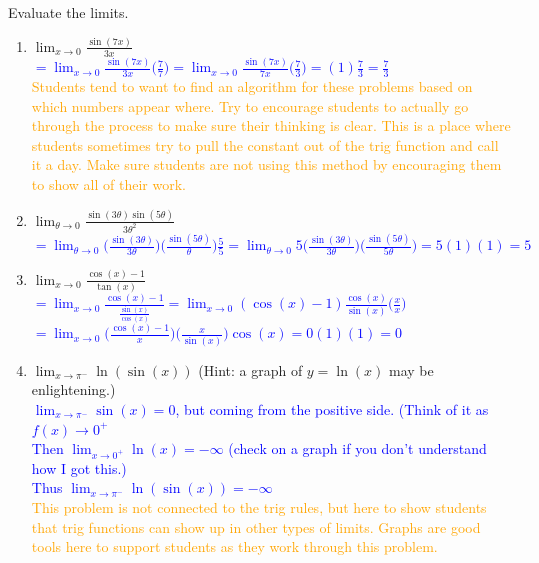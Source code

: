 \documentclass{ximera}
\begin{document}
\begin{exercise}
    Evaluate the limits.
    \begin{enumerate}
        \item $\displaystyle \lim_{x\rightarrow 0}\frac{\sin(7x)}{3x}$\\
        \textcolor{blue}{$=\lim_{x\rightarrow 0} \frac{\sin(7x)}{3x}\bigg(\frac{7}{7}\bigg)=\lim_{x\rightarrow 0}\frac{\sin(7x)}{7x}\bigg(\frac{7}{3}\bigg)=(1)\frac{7}{3}=\frac{7}{3}$}\\
        \textcolor{orange}{Students tend to want to find an algorithm for these problems based on which numbers appear where.  Try to encourage students to actually go through the process to make sure their thinking is clear.  This is a place where students sometimes try to pull the constant out of the trig function and call it a day.  Make sure students are not using this method by encouraging them to show all of their work.}

        \item $\displaystyle\lim_{\theta \rightarrow 0}\frac{\sin(3\theta)\sin(5\theta)}{3\theta^2}$\\
        \textcolor{blue}{$=\lim_{\theta\rightarrow 0}\bigg(\frac{\sin(3\theta)}{3\theta}\bigg)\bigg(\frac{\sin(5\theta)}{\theta}\bigg)\frac{5}{5}=\lim_{\theta\rightarrow 0}5\bigg(\frac{\sin(3\theta)}{3\theta}\bigg)\bigg(\frac{\sin(5\theta)}{5\theta}\bigg)=5(1)(1)=5$}

        \item $\displaystyle\lim_{x\rightarrow 0} \frac{\cos(x)-1}{\tan(x)}$\\
        \textcolor{blue}{$=\displaystyle\lim_{x\rightarrow 0}\frac{\cos(x)-1}{\frac{\sin(x)}{\cos(x)}}=\lim_{x\rightarrow 0}(\cos(x)-1)\frac{\cos(x)}{\sin(x)}\bigg(\frac{x}{x}\bigg)$\\
        $=\displaystyle \lim_{x\rightarrow 0}\bigg(\frac{\cos(x)-1}{x}\bigg)\bigg(\frac{x}{\sin(x)}\bigg)\cos(x)=0(1)(1)=0$}

        \item $\displaystyle\lim_{x\rightarrow \pi^-} \ln(\sin(x))$ (Hint: a graph of $y=\ln(x)$ may be enlightening.)\\
        \textcolor{blue}{$\displaystyle\lim_{x\rightarrow \pi^-}\sin(x)=0$, but coming from the positive side. (Think of it as $f(x)\rightarrow 0^+$\\
        Then $\displaystyle\lim_{x\rightarrow 0^+}\ln(x)=-\infty$ (check on a graph if you don't understand how I got this.) \\
        Thus $\displaystyle\lim_{x\rightarrow \pi^-} \ln(\sin(x))=-\infty$}\\
        \textcolor{orange}{This problem is not connected to the trig rules, but here to show students that trig functions can show up in other types of limits. Graphs are good tools here to support students as they work through this problem.}
    \end{enumerate}  
    
\end{exercise}
\end{document}
